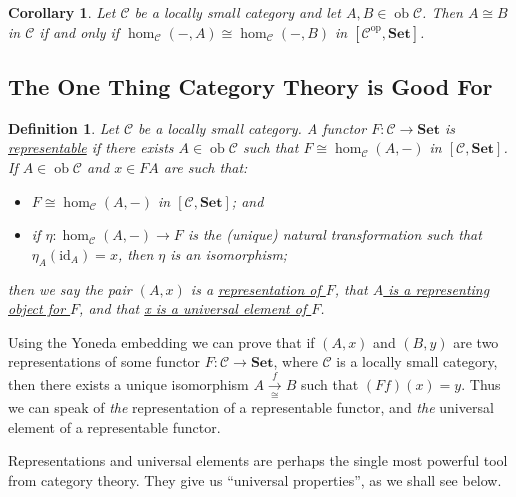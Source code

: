 \documentclass[a4paper,11pt]{article}
\theoremstyle{break_italics}
\newtheorem*{corollary*}{Corollary}
\newtheorem*{definition*}{Definition}
\theoremstyle{break_upright}
\theoremstyle{remark}
\newcommand{\id}{\mathrm{id}}
\newcommand{\ob}{\operatorname{ob}}
\newcommand{\C}{\mathcal{C}}
\newcommand{\Set}{\mathbf{Set}}
\newcommand{\op}{\mathrm{op}}
\begin{document}
\begin{corollary*}
Let $\C$ be a locally small category and let $A,B\in\ob\C$. Then $A \cong B$ in $\C$ if and only if $\hom_\C(-,A) \cong \hom_\C(-,B)$ in $[\C^\op, \Set]$.	
\end{corollary*}



\subsection{The One Thing Category Theory is Good For}

\begin{definition*}
	Let $\C$ be a locally small category. A functor $F \colon \C \to \Set$ is \uline{representable} if there exists $A \in \ob\C$ such that $F \cong \hom_{\C}(A,-)$ in $[\C,\Set]$. If $A \in \ob\C$ and $x \in FA$ are such that:
	\begin{itemize}
		\item $F \cong \hom_\C(A, -)$ in $[\C,\Set]$; and
		\item if $\eta \colon \hom_\C(A,-) \to F$ is the (unique) natural transformation such that $\eta_A(\id_A) = x$, then $\eta$ is an isomorphism;
	\end{itemize}
	then we say the pair $(A,x)$ is a \uline{representation of $F$}, that \uline{$A$ is a representing object for $F$}, and that \uline{x is a universal element of $F$}.
\end{definition*}

Using the Yoneda embedding we can prove that if $(A,x)$ and $(B,y)$ are two representations of some functor $F \colon \C \to \Set$, where $\C$ is a locally small category, then there exists a unique isomorphism $A \xrightarrow[\cong]{f} B$ such that $(Ff)(x) = y$. Thus we can speak of \textit{the} representation of a representable functor, and \textit{the} universal element of a representable functor.

Representations and universal elements are perhaps the single most powerful tool from category theory. They give us ``universal properties'', as we shall see below.
\end{document}
